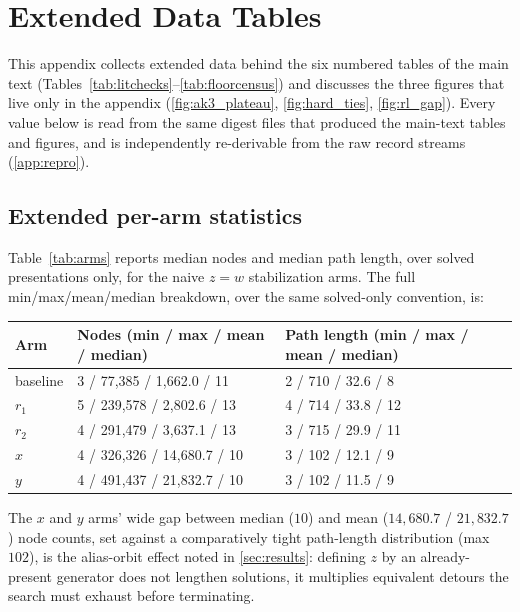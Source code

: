 \section{Extended Data Tables}\label{app:tables}

This appendix collects extended data behind the six numbered tables of the main text
(Tables~\ref{tab:litchecks}--\ref{tab:floorcensus}) and discusses the three figures that
live only in the appendix (\ref{fig:ak3_plateau}, \ref{fig:hard_ties}, \ref{fig:rl_gap}).
Every value below is read from the same digest files that produced the main-text tables and
figures, and is independently re-derivable from the raw record streams (\ref{app:repro}).

\subsection{Extended per-arm statistics}

Table~\ref{tab:arms} reports median nodes and median path length, over solved presentations
only, for the naive $z=w$ stabilization arms. The full min/max/mean/median breakdown, over
the same solved-only convention, is:

\begin{center}
\small
\begin{tabular}{@{}lll@{}}
\toprule
Arm & Nodes (min / max / mean / median) & Path length (min / max / mean / median) \\
\midrule
baseline & 3 / 77,385 / 1,662.0 / 11 & 2 / 710 / 32.6 / 8 \\
$r_1$    & 5 / 239,578 / 2,802.6 / 13 & 4 / 714 / 33.8 / 12 \\
$r_2$    & 4 / 291,479 / 3,637.1 / 13 & 3 / 715 / 29.9 / 11 \\
$x$      & 4 / 326,326 / 14,680.7 / 10 & 3 / 102 / 12.1 / 9 \\
$y$      & 4 / 491,437 / 21,832.7 / 10 & 3 / 102 / 11.5 / 9 \\
\bottomrule
\end{tabular}
\end{center}

The $x$ and $y$ arms' wide gap between median ($10$) and mean ($14{,}680.7$ / $21{,}832.7$)
node counts, set against a comparatively tight path-length distribution (max $102$), is the
alias-orbit effect noted in \ref{sec:results}: defining $z$ by an already-present generator
does not lengthen solutions, it multiplies equivalent detours the search must exhaust
before terminating.

